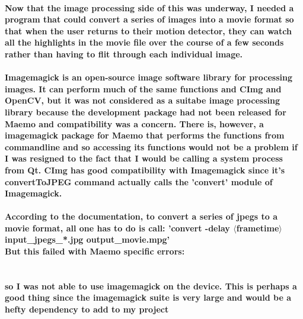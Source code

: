 \paragraph{Now that the image processing side of this was underway, I needed a program that could convert a series of images into a movie format so that when the user returns to their motion detector, they can watch all the highlights in the movie file over the course of a few seconds rather than having to flit through each individual image.
}
\paragraph{Imagemagick is an open-source image software library for processing images. It can perform much of the same functions and CImg and OpenCV, but it was not considered as a suitabe image processing library because the development package had not been released for Maemo and compatibility was a concern. There is, however, a imagemagick package for Maemo that performs the functions from commandline and so accessing its functions would not be a problem if I was resigned to the fact that I would be calling a system process from Qt. CImg has good compatibility with Imagemagick since it's convertToJPEG command actually calls the 'convert' module of Imagemagick.}
\paragraph{
According to the documentation, to convert a series of jpegs to a movie format, all one has to do is call:
'convert -delay \(\langle\)frametime\(\rangle\) input\_jpegs\_*.jpg output\_movie.mpg'\\
But this failed with Maemo specific errors:\\\\}
\begin{frame}[fragile]

\end{frame}
\paragraph{so I was not able to use imagemagick on the device. This is perhaps a good thing since the imagemagick suite is very large and would be a hefty dependency to add to my project
}
